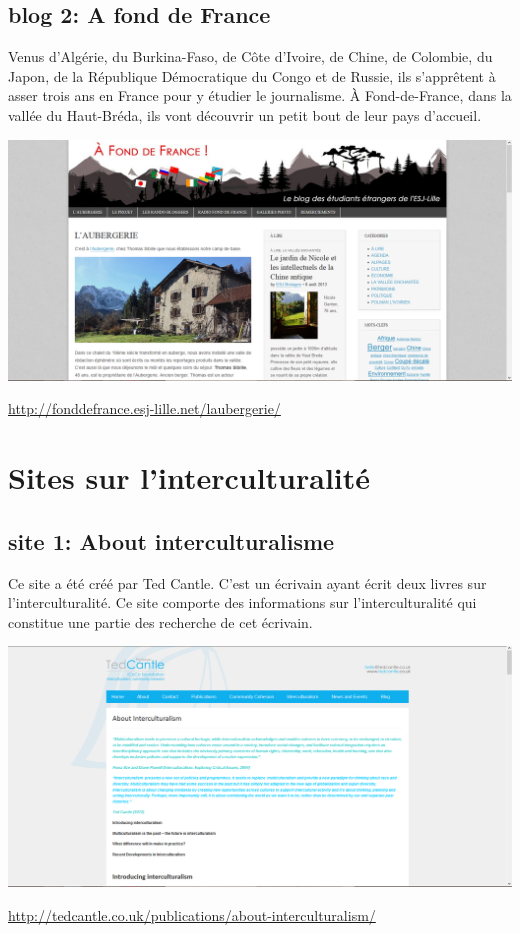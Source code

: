 \section{blog 2: A fond de France}
Venus d’Algérie, du Burkina-Faso, de Côte d’Ivoire, de Chine, de Colombie, du Japon, de la République Démocratique du Congo et de Russie, ils s’apprêtent à asser trois ans en France pour y étudier le journalisme. À Fond-de-France, dans la vallée du Haut-Bréda, ils vont découvrir un petit bout de leur pays d’accueil.
\begin{center}
\includegraphics[scale=0.25]{AFondDeFrance.png}
\end{center}
\url{http://fonddefrance.esj-lille.net/laubergerie/}

\chapter{Sites sur l'interculturalité}
\section{site 1: About interculturalisme}
Ce site a été créé par Ted Cantle. C'est un écrivain ayant écrit deux livres sur l'interculturalité. Ce site comporte des informations sur l'interculturalité  qui constitue une partie des recherche de cet écrivain.
\begin{center}
\includegraphics[scale=0.25]{interculturality.png}
\end{center}
\url{http://tedcantle.co.uk/publications/about-interculturalism/}

